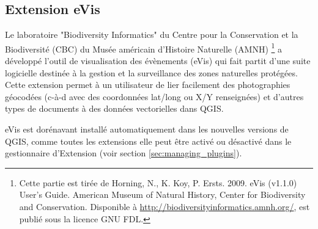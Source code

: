 
\subsection{Extension eVis}\label{sec:evis}


Le laboratoire "Biodiversity Informatics" du Centre pour la Conservation et la Biodiversité (CBC) du Musée américain d'Histoire Naturelle (AMNH) \footnote{Cette partie est tirée de Horning, N., K. Koy, P. Ersts. 2009. eVis (v1.1.0) User's Guide. American Museum of
Natural History, Center for Biodiversity and Conservation. Disponible à \url{http://biodiversityinformatics.amnh.org/}, est publié sous la licence GNU FDL.} a développé l'outil de visualisation des évènements (eVis) qui fait partit d'une suite logicielle destinée à la gestion et la surveillance des zones naturelles protégées. Cette extension permet à un utilisateur de lier facilement des photographies géocodées (c-à-d avec des coordonnées lat/long ou X/Y renseignées) et d'autres types de documents à des données vectorielles dans QGIS.


eVis est dorénavant installé automatiquement dans les nouvelles versions de QGIS, comme toutes les extensions elle peut être activé ou désactivé dans le gestionnaire d'Extension (voir section \ref{sec:managing_plugins}).

